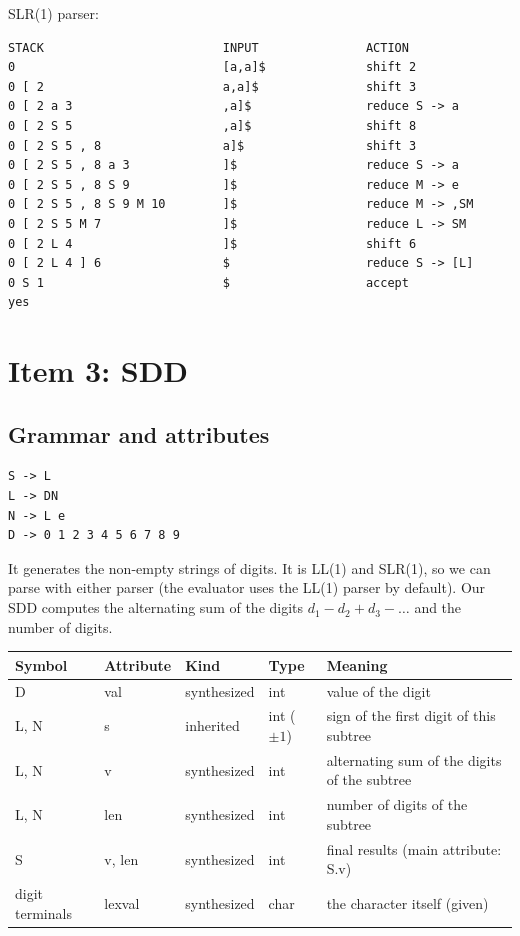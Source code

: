 \documentclass[11pt]{article}
\begin{document}
SLR(1) parser:
\begin{verbatim}
STACK                         INPUT               ACTION
0                             [a,a]$              shift 2
0 [ 2                         a,a]$               shift 3
0 [ 2 a 3                     ,a]$                reduce S -> a
0 [ 2 S 5                     ,a]$                shift 8
0 [ 2 S 5 , 8                 a]$                 shift 3
0 [ 2 S 5 , 8 a 3             ]$                  reduce S -> a
0 [ 2 S 5 , 8 S 9             ]$                  reduce M -> e
0 [ 2 S 5 , 8 S 9 M 10        ]$                  reduce M -> ,SM
0 [ 2 S 5 M 7                 ]$                  reduce L -> SM
0 [ 2 L 4                     ]$                  shift 6
0 [ 2 L 4 ] 6                 $                   reduce S -> [L]
0 S 1                         $                   accept
yes
\end{verbatim}

\section{Item 3: SDD}
\subsection{Grammar and attributes}
\begin{verbatim}
S -> L
L -> DN
N -> L e
D -> 0 1 2 3 4 5 6 7 8 9
\end{verbatim}
It generates the non-empty strings of digits. It is LL(1) and SLR(1), so we can parse with either parser
(the evaluator uses the LL(1) parser by default). Our SDD computes the alternating sum of the digits
$d_1-d_2+d_3-\dots$ and the number of digits.
\begin{center}
\begin{tabular}{llllp{6.2cm}}
\toprule
Symbol & Attribute & Kind & Type & Meaning\\
\midrule
D & val & synthesized & int & value of the digit\\
L, N & s & inherited & int ($\pm1$) & sign of the first digit of this subtree\\
L, N & v & synthesized & int & alternating sum of the digits of the subtree\\
L, N & len & synthesized & int & number of digits of the subtree\\
S & v, len & synthesized & int & final results (main attribute: S.v)\\
digit terminals & lexval & synthesized & char & the character itself (given)\\
\bottomrule
\end{tabular}
\end{center}
\end{document}
